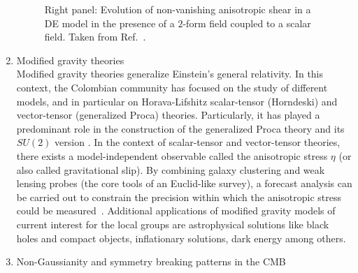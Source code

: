 \documentclass[a4paper,11pt]{article}
\begin{document}
\begin{enumerate}
\begin{figure}
{	Right panel: Evolution of non-vanishing anisotropic shear in a DE model in the presence of a $2$-form field coupled to a scalar field. Taken from Ref.~\cite{Almeida:2019iqp}. }
	\label{fig:cosmo}
\end{figure} 
%
%
\item
Modified gravity theories\\
Modified gravity theories generalize Einstein's general relativity.
In this context, the Colombian community has focused on the study of different models, and in particular on Horava-Lifshitz \cite{Briscese:2012rz} scalar-tensor (Horndeski) and vector-tensor (generalized Proca) theories.  Particularly, it has played a predominant role in the construction of the generalized Proca theory \cite{Allys:2015sht,Allys:2016jaq,Rodriguez:2017ckc,GallegoCadavid:2019zke} and its $SU(2)$ version \cite{Allys:2016kbq, Gomez:2019tbj}. In the context of scalar-tensor and vector-tensor theories, there exists a model-independent observable called the anisotropic stress $\eta$ (or also called gravitational slip). By combining galaxy clustering and weak lensing probes (the core tools of an Euclid-like survey), a forecast analysis can be carried out to constrain the precision within which the anisotropic stress could be measured~\cite{Amendola:2013qna}. Additional applications of modified gravity models of current interest for the local groups are astrophysical solutions like black holes and compact objects, inflationary solutions, dark energy \cite{Rodriguez:2017wkg, Gomez:2020sfz} among others. 
%
\item
Non-Gaussianity and symmetry breaking patterns in the CMB\\

\end{enumerate}
\end{document}
